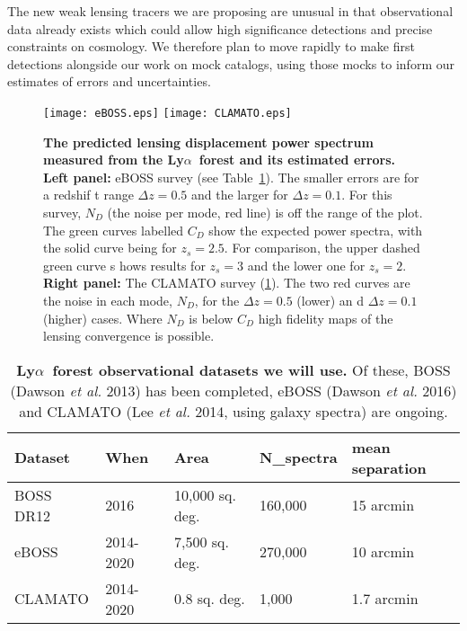 \documentclass[12pt]{article}
\def\lya{Ly$\alpha$}
\begin{document}
\begin{small}
The new weak lensing tracers we are proposing are unusual in that
observational data already exists which could allow high
significance detections and precise constraints on cosmology. We
therefore plan to move rapidly  to make first detections alongside
our work on mock catalogs,  using those mocks to
inform our estimates of errors and uncertainties.



\begin{figure}
 \texttt{[image: eBOSS.eps]}
 \texttt{[image: CLAMATO.eps]}
 \caption{ {\bf The predicted lensing displacement power spectrum  measured
from the \lya\ forest and its 
estimated errors. }
{\bf Left panel:}
eBOSS survey  (see Table~\ref{obs}). The smaller errors are for a redshif
t range $\Delta z =0.5$ and the larger for $\Delta z = 0.1$.  For this survey,  $N_D$ (the noise per 
mode, red line)  is off the range of the plot.  The green curves labelled $C_D$ show the expected power spectra, with the solid curve being for $z_s=2.5$.  For comparison, the upper dashed green curve s
hows results for $z_s=3$ and the lower one for $z_s=2$. {\bf Right panel:}
The CLAMATO survey (\ref{obs}).
The two red curves are the noise in each mode, $N_D$, for the $\Delta z =0.5$ (lower) an
d $\Delta z = 0.1$ (higher) cases.  Where $N_D$ is below $C_D$ high fidelity maps of the lensing convergence is possible.}

 \label{pkpred}
\end{figure}



\begin{table}
\begin{tabular}{|l|l|l|l|l|}
\hline
Dataset   & When      & Area            & N_{\rm spectra} & mean separation \\ \hline
BOSS DR12 & 2016      & 10,000 sq. deg. & 160,000            & 15 arcmin       \\
eBOSS     & 2014-2020 & 7,500 sq. deg.  & 270,000            & 10 arcmin       \\
CLAMATO   & 2014-2020 & 0.8 sq. deg.    & 1,000              & 1.7 arcmin      \\
\hline
\end{tabular}
\centering
\caption{
{\bf \lya\ forest observational
datasets we will use.} 
Of these, BOSS (Dawson {\it et al.} 2013) has been completed,
eBOSS (Dawson {\it et al.} 2016) and CLAMATO (Lee {\it et al.} 2014, using
galaxy spectra) are ongoing. }
\label{obs}
\end{table}




\end{small}
\end{document}
